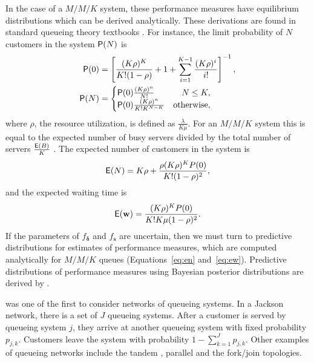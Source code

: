 \documentclass[article]{jss}
\begin{document}
In the case of a $M/M/K$ system, these performance measures have 
equilibrium distributions which can be derived analytically. These derivations are 
found in standard queueing theory textbooks \citep{lipsky2008queueing,thomopoulos2012fundamentals}. 
For instance, the limit probability of $N$ customers in the system $\mathsf{P}(N)$ is
%
\begin{align}
\mathsf{P}(0) &= \left[\frac{ (K \rho)^K}{K! (1 - \rho)} + 1 + \sum_{i=1}^{K-1} \frac{(K \rho)^i}{i!}   \right]^{-1}, \nonumber \\
\mathsf{P}(N) &= \begin{cases} 
\mathsf{P}(0) \frac{(K \rho)^n }{N!} & \quad  N \leq K,\\
\mathsf{P}(0) \frac{(K \rho)^n }{K! K^{N-K}} & \text{otherwise} ,
\end{cases} \label{eq:pn}
\end{align}
%
where $\rho$, the resource utilization, is defined as
$\frac{\lambda}{K \mu}$. For an $M/M/K$ system this is equal to the
expected number of busy servers divided by the total number of servers
$\frac{\mathsf{E}(B)}{K}$ \citep[p.~451]{cassandras2009introduction}. The
expected number of customers in the system is
\citep{bhat2015introduction}
%
\begin{align}
\mathsf{E}(N) = K\rho + \frac{\rho (K\rho)^K P(0)}{K!(1-\rho)^2} \label{eq:en},
\end{align}
%
and the expected waiting time is
%
\begin{align}
\mathsf{E}(\mathbf{w}) = \frac{(K \rho)^K P(0)}{K! K \mu(1-\rho)^2} \label{eq:ew}.
\end{align}
%
If the parameters of $f_{\boldsymbol{\delta}}$ and $f_{\mathbf{s}}$ are uncertain,
then we must turn to predictive distributions for estimates of
performance measures, which are computed analytically for $M/M/K$
queues (Equations~\ref{eq:en} and~\ref{eq:ew}). Predictive
distributions of performance measures using Bayesian posterior
distributions are derived by \citet{armero1994bayesian,
  armero1999dealing}.

\citet{jackson_networks_1957} was one of the first to consider networks of queueing systems. In a Jackson network, there is a set of $J$ queueing systems. After a customer is served by queueing system $j$, they arrive at another queueing system with fixed probability $p_{j,k}$. Customers leave the system with probability $1 - \sum_{k=1}^{J} p_{j,k}$. Other examples of queueing networks include the tandem \citep{glynn_departures_1991}, parallel \citep{hunt_fast_1995} and the fork/join \citep{kim_analysis_1989} topologies. 
\end{document}
